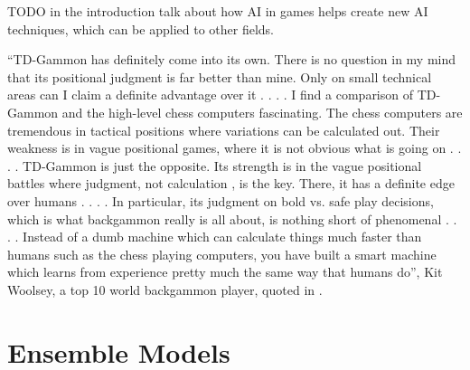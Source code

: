 TODO in the introduction talk about how AI in games helps create new AI techniques, which can be applied to other fields.

“TD-Gammon has definitely come into its own. There is no question in my mind that its positional judgment is far better than mine.
Only on small technical areas can I claim a definite advantage over
it . . . . I find a comparison of TD-Gammon and the high-level chess
computers fascinating. The chess computers are tremendous in
tactical positions where variations can be calculated out. Their
weakness is in vague positional games, where it is not obvious
what is going on . . . . TD-Gammon is just the opposite. Its strength
is in the vague positional battles where judgment, not calculation ,
is the key. There, it has a definite edge over humans . . . . In particular, its judgment on bold vs. safe play decisions, which is what
backgammon really is all about, is nothing short of phenomenal . . . .
Instead of a dumb machine which can calculate things much faster
than humans such as the chess playing computers, you have built
a smart machine which learns from experience pretty much the
same way that humans do”, Kit Woolsey, a top 10 world backgammon player, quoted in \cite{Tesauro1995}.



\section{Ensemble Models}